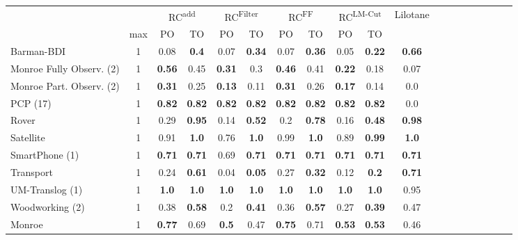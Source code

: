 \begin{tabular}{lccccccccccccccccccl} 
\toprule 
  && \multicolumn{2}{c}{RC\textsuperscript{add}} & \multicolumn{2}{c}{RC\textsuperscript{Filter}} & \multicolumn{2}{c}{RC\textsuperscript{FF}} & \multicolumn{2}{c}{RC\textsuperscript{LM-Cut}} & \multicolumn{2}{c}{Lilotane} \\ 
\cmidrule(lr){3-4} \cmidrule(lr){5-6} \cmidrule(lr){7-8} \cmidrule(lr){9-10} \cmidrule(lr){11-12}  
 & max &PO & TO & PO & TO & PO & TO & PO &\multicolumn{2}{c}{ TO  } \\ 
\midrule 
Barman-BDI & 1 & 0.08 & \textbf{0.4} & 0.07 & \textbf{0.34} & 0.07 & \textbf{0.36} & 0.05 & \textbf{0.22} &\multicolumn{2}{c}{ \textbf{0.66}  } \\ 
 Monroe Fully Observ. (2) & 1 & \textbf{0.56} & 0.45 & \textbf{0.31} & 0.3 & \textbf{0.46} & 0.41 & \textbf{0.22} & 0.18 &\multicolumn{2}{c}{ 0.07  } \\ 
 Monroe Part. Observ. (2) & 1 & \textbf{0.31} & 0.25 & \textbf{0.13} & 0.11 & \textbf{0.31} & 0.26 & \textbf{0.17} & 0.14 &\multicolumn{2}{c}{ 0.0  } \\ 
PCP (17) & 1 & \textbf{0.82} & \textbf{0.82} & \textbf{0.82} & \textbf{0.82} & \textbf{0.82} & \textbf{0.82} & \textbf{0.82} & \textbf{0.82} &\multicolumn{2}{c}{ 0.0  } \\ 
Rover & 1 & 0.29 & \textbf{0.95} & 0.14 & \textbf{0.52} & 0.2 & \textbf{0.78} & 0.16 & \textbf{0.48} &\multicolumn{2}{c}{ \textbf{0.98}  } \\ 
Satellite & 1 & 0.91 & \textbf{1.0} & 0.76 & \textbf{1.0} & 0.99 & \textbf{1.0} & 0.89 & \textbf{0.99} &\multicolumn{2}{c}{ \textbf{1.0}  } \\ 
SmartPhone (1) & 1 & \textbf{0.71} & \textbf{0.71} & 0.69 & \textbf{0.71} & \textbf{0.71} & \textbf{0.71} & \textbf{0.71} & \textbf{0.71} &\multicolumn{2}{c}{ \textbf{0.71}  } \\ 
Transport & 1 & 0.24 & \textbf{0.61} & 0.04 & \textbf{0.05} & 0.27 & \textbf{0.32} & 0.12 & \textbf{0.2} &\multicolumn{2}{c}{ \textbf{0.71}  } \\ 
UM-Translog (1) & 1 & \textbf{1.0} & \textbf{1.0} & \textbf{1.0} & \textbf{1.0} & \textbf{1.0} & \textbf{1.0} & \textbf{1.0} & \textbf{1.0} &\multicolumn{2}{c}{ 0.95  } \\ 
Woodworking (2)& 1 & 0.38 & \textbf{0.58} & 0.2 & \textbf{0.41} & 0.36 & \textbf{0.57} & 0.27 & \textbf{0.39} &\multicolumn{2}{c}{ 0.47  } \\ 
\midrule 
 Monroe & 1 & \textbf{0.77} & 0.69 & \textbf{0.5} & 0.47 & \textbf{0.75} & 0.71 & \textbf{0.53} & \textbf{0.53} &\multicolumn{2}{c}{ 0.46  } \\ 

\end{tabular}
